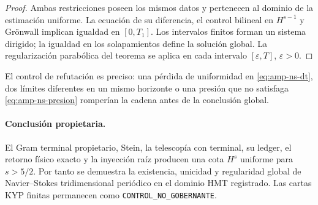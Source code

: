 \begin{proof}
Ambas restricciones poseen los mismos datos y pertenecen al dominio de la
estimación uniforme. La ecuación de su diferencia, el control bilineal en
\(H^{s-1}\) y Grönwall implican igualdad en \([0,T_1]\). Los intervalos
finitos forman un sistema dirigido; la igualdad en los solapamientos define
la solución global. La regularización parabólica del teorema se aplica en
cada intervalo \([\varepsilon,T]\), \(\varepsilon>0\).
\end{proof}

El control de refutación es preciso: una pérdida de uniformidad en
\eqref{eq:amp-ns-dt}, dos límites diferentes en un mismo horizonte o una
presión que no satisfaga \eqref{eq:amp-ns-presion} romperían la cadena antes
de la conclusión global.

\paragraph{Conclusión propietaria.}
El Gram terminal propietario, Stein, la telescopía con terminal, su ledger,
el retorno físico exacto y la inyección raíz producen una cota \(H^s\) uniforme para
\(s>5/2\). Por tanto se demuestra la existencia, unicidad y regularidad
global de Navier--Stokes tridimensional periódico en el dominio HMT
registrado. Las cartas KYP finitas permanecen como
\texttt{CONTROL\_NO\_GOBERNANTE}.
